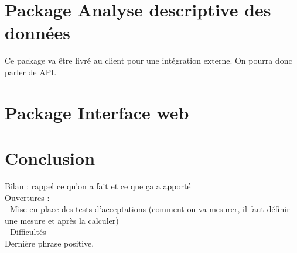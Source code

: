 	
	\section{Package Analyse descriptive des données}
	Ce package va être livré au client pour une intégration externe. On pourra donc parler de API.
	
	\section{Package Interface web}
	
	
	\section*{Conclusion}
		Bilan : rappel ce qu'on a fait et ce que ça a apporté\\
		Ouvertures :\\
			- Mise en place des tests d'acceptations (comment on va mesurer, il faut définir une mesure et après la calculer)\\
			- Difficultés\\
		Dernière phrase positive.
		

